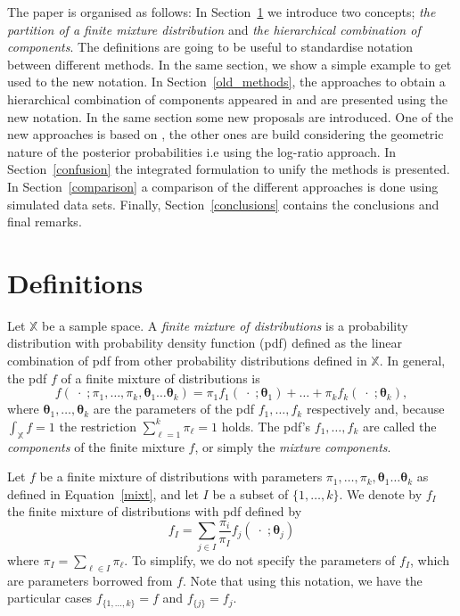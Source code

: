 \documentclass[10pt, a4paper]{article}
\newcommand{\m}[1]{\boldsymbol{#1}}
\begin{document}
The paper is organised as follows: In Section~\ref{definitions} we introduce two concepts; \emph{the partition of a finite mixture distribution} and \emph{the hierarchical combination of components}. The definitions are going to be useful to standardise notation between different methods. In the same section, we show a simple example to get used to the new notation. In Section~\ref{old_methods}, the approaches to obtain a hierarchical combination of components appeared in \cite{hennig2010methods} and \cite{baudry2010combining} are presented using the new notation. In the same section some new proposals are introduced. One of the new approaches is based on \cite{longford2014}, the other ones are build considering the geometric nature of the posterior probabilities i.e using the log-ratio approach. In Section~\ref{confusion} the integrated formulation to unify the methods is presented. In Section~\ref{comparison} a comparison of the different approaches is done using simulated data sets. Finally, Section~\ref{conclusions} contains the conclusions and final remarks.

\section{Definitions}
\label{definitions}

Let $\mathbb{X}$ be a sample space. A \emph{finite mixture of distributions} is a probability distribution with probability density function (pdf) defined as the linear combination of pdf from other probability distributions defined in $\mathbb{X}$. In general, the pdf $f$ of a finite mixture of distributions is
\begin{equation}\label{mixt}
f(\;\cdot\; ; \pi_1, \dots, \pi_k, \m\theta_1 \dots \m\theta_k) = \pi_1 f_1(\;\cdot\; ; \m\theta_1) + \dots + \pi_k f_k(\;\cdot\; ; \m\theta_k),
\end{equation}
where $\m\theta_1, \dots,  \m\theta_k$ are the parameters of the pdf $f_1, \dots, f_k$ respectively and, because $\int_{\mathbb{X}}f = 1$ the restriction $\sum_{\ell = 1}^k \pi_\ell = 1$ holds. The pdf's $f_1, \dots, f_k$ are called the \emph{components} of the finite mixture $f$, or simply the \emph{mixture components}.

Let $f$ be a finite mixture of distributions with  parameters  $\pi_1, \dots, \pi_k, \m\theta_1 \dots \m\theta_k$ as defined in Equation~\ref{mixt}, and let $I$  be a subset of $\{1, \dots, k\}$. We denote by $f_I$ the finite mixture of distributions with pdf defined by
\[
f_I = \sum_{j \in I} \frac{\pi_i}{\pi_I} f_j(\;\cdot\; ; \m\theta_j)
\]
where $\pi_I = \sum_{\ell \in I} \pi_\ell$. To simplify, we do not specify the parameters of $f_I$, which are parameters borrowed from $f$. Note that using this notation, we have the particular cases $f_{\{1, \dots, k\}} = f$ and $f_{\{j\}} = f_j$.
\end{document}
